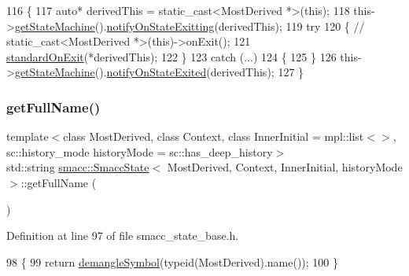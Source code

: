 \begin{DoxyCode}
116     \{
117         \textcolor{keyword}{auto}* derivedThis = \textcolor{keyword}{static\_cast<}MostDerived *\textcolor{keyword}{>}(\textcolor{keyword}{this});
118         this->\hyperlink{classsmacc_1_1SmaccState_afc39f8e0ca4001b2159a100da2fccd0e}{getStateMachine}().\hyperlink{classsmacc_1_1ISmaccStateMachine_a707c36f8b02eeed1af624dd36a5a4957}{notifyOnStateExitting}(derivedThis);
119         \textcolor{keywordflow}{try}
120         \{          \textcolor{comment}{// static\_cast<MostDerived *>(this)->onExit();}
121           \hyperlink{namespacesmacc_ab3aebd999834404be47a62ea03aacfc9}{standardOnExit}(*derivedThis);
122         \}
123         \textcolor{keywordflow}{catch} (...)
124         \{
125         \}
126         this->\hyperlink{classsmacc_1_1SmaccState_afc39f8e0ca4001b2159a100da2fccd0e}{getStateMachine}().\hyperlink{classsmacc_1_1ISmaccStateMachine_ac352013a5df0dcce0594f1466b9a6f7b}{notifyOnStateExited}(derivedThis);
127     \}
\end{DoxyCode}
\mbox{\label{classsmacc_1_1SmaccState_a897dbdfe52a8b944d4bf1844ddcc3aa5}} 
\subsubsection{\texorpdfstring{get\+Full\+Name()}{getFullName()}}
{\footnotesize\ttfamily template$<$class Most\+Derived, class Context, class Inner\+Initial = mpl\+::list$<$$>$, sc\+::history\+\_\+mode history\+Mode = sc\+::has\+\_\+deep\+\_\+history$>$ \\
std\+::string \hyperlink{classsmacc_1_1SmaccState}{smacc\+::\+Smacc\+State}$<$ Most\+Derived, Context, Inner\+Initial, history\+Mode $>$\+::get\+Full\+Name (\begin{DoxyParamCaption}{ }\end{DoxyParamCaption})\hspace{0.3cm}{\ttfamily [inline]}}



Definition at line 97 of file smacc\+\_\+state\+\_\+base.\+h.


\begin{DoxyCode}
98     \{
99       \textcolor{keywordflow}{return} \hyperlink{namespacesmacc_1_1introspection_a2f495108db3e57604d8d3ff5ef030302}{demangleSymbol}(\textcolor{keyword}{typeid}(MostDerived).name());
100     \}
\end{DoxyCode}
\mbox{\label{classsmacc_1_1SmaccState_ad53b5be2760eb7ffb50f3b2e542b65f1}} 

